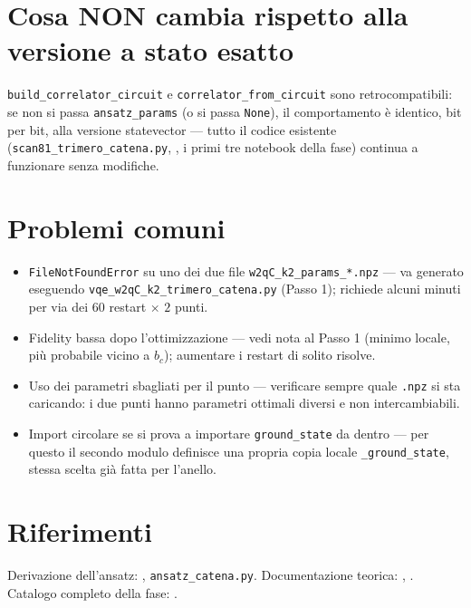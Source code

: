 \documentclass[11pt,a4paper]{article}
\begin{document}
\section*{Cosa NON cambia rispetto alla versione a stato esatto}

\texttt{build\_correlator\_circuit} e \texttt{correlator\_from\_circuit} sono retrocompatibili:
se non si passa \texttt{ansatz\_params} (o si passa \texttt{None}), il comportamento è
identico, bit per bit, alla versione statevector --- tutto il codice esistente
(\texttt{scan81\_trimero\_catena.py}, \texttt{},
i primi tre notebook della fase) continua a funzionare senza modifiche.

\section*{Problemi comuni}

\begin{itemize}
\item \texttt{FileNotFoundError} su uno dei due file \texttt{w2qC\_k2\_params\_*.npz} --- va
generato eseguendo \texttt{vqe\_w2qC\_k2\_trimero\_catena.py} (Passo 1); richiede alcuni minuti
per via dei $60$ restart $\times$ $2$ punti.
\item Fidelity bassa dopo l'ottimizzazione --- vedi nota al Passo 1 (minimo locale, più probabile
vicino a $b_c$); aumentare i restart di solito risolve.
\item Uso dei parametri sbagliati per il punto --- verificare sempre quale \texttt{.npz} si sta
caricando: i due punti hanno parametri ottimali diversi e non intercambiabili.
\item Import circolare se si prova a importare \texttt{ground\_state} da
\texttt{} dentro
\texttt{} --- per questo il secondo modulo definisce
una propria copia locale \texttt{\_ground\_state}, stessa scelta già fatta per l'anello.
\end{itemize}

\section*{Riferimenti}

Derivazione dell'ansatz: \texttt{},
\texttt{ansatz\_catena.py}. Documentazione teorica: \texttt{},
\texttt{}. Catalogo completo
della fase: \texttt{}.
\end{document}
